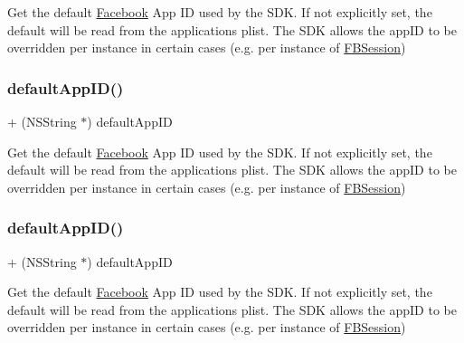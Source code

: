 Get the default \hyperlink{interfaceFacebook}{Facebook} App ID used by the S\+DK. If not explicitly set, the default will be read from the application\textquotesingle{}s plist. The S\+DK allows the app\+ID to be overridden per instance in certain cases (e.\+g. per instance of \hyperlink{interfaceFBSession}{F\+B\+Session}) \mbox{\label{interfaceFBSettings_af60cce044316df28d128d64e79a77ba5}} 
\subsubsection{\texorpdfstring{default\+App\+I\+D()}{defaultAppID()}\hspace{0.1cm}{\footnotesize\ttfamily [2/5]}}
{\footnotesize\ttfamily + (N\+S\+String $\ast$) default\+App\+ID \begin{DoxyParamCaption}{ }\end{DoxyParamCaption}}

Get the default \hyperlink{interfaceFacebook}{Facebook} App ID used by the S\+DK. If not explicitly set, the default will be read from the application\textquotesingle{}s plist. The S\+DK allows the app\+ID to be overridden per instance in certain cases (e.\+g. per instance of \hyperlink{interfaceFBSession}{F\+B\+Session}) \mbox{\label{interfaceFBSettings_af60cce044316df28d128d64e79a77ba5}} 
\subsubsection{\texorpdfstring{default\+App\+I\+D()}{defaultAppID()}\hspace{0.1cm}{\footnotesize\ttfamily [3/5]}}
{\footnotesize\ttfamily + (N\+S\+String $\ast$) default\+App\+ID \begin{DoxyParamCaption}{ }\end{DoxyParamCaption}}

Get the default \hyperlink{interfaceFacebook}{Facebook} App ID used by the S\+DK. If not explicitly set, the default will be read from the application\textquotesingle{}s plist. The S\+DK allows the app\+ID to be overridden per instance in certain cases (e.\+g. per instance of \hyperlink{interfaceFBSession}{F\+B\+Session}) \mbox{\label{interfaceFBSettings_af60cce044316df28d128d64e79a77ba5}} 
